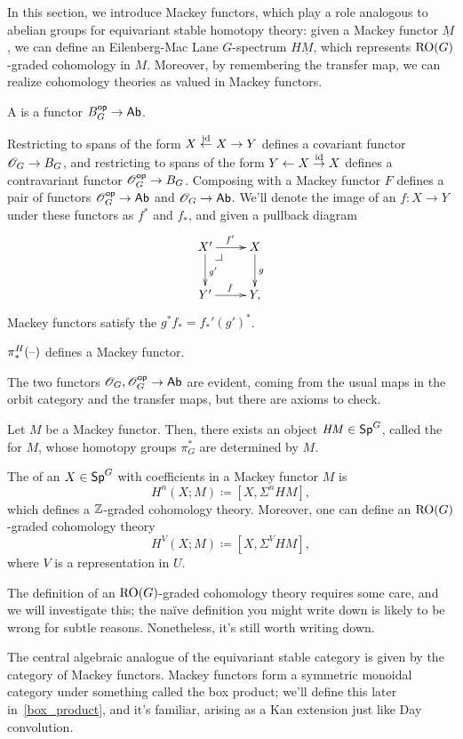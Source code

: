 In this section, we introduce Mackey functors, which play a role analogous to abelian groups for equivariant stable
homotopy theory: given a Mackey functor $\underline M$, we can define an Eilenberg-Mac Lane $G$-spectrum
$H\underline M$, which represents $\mathrm{RO}(G)$-graded cohomology in $M$. Moreover, by remembering the transfer map, we
can realize cohomology theories as valued in Mackey functors.
\begin{defn}
A  is a functor $B_G^{\mathsf{op}}\to\mathsf{Ab}$.
\end{defn}
Restricting to spans of the form $X\stackrel{\mathrm{id}}\gets X\to Y$ defines a covariant functor
$\mathscr O_G\to B_G$, and restricting to spans of the form $Y\gets X\stackrel{\mathrm{id}}\to X$ defines a contravariant functor
$\mathscr O_G^{\mathsf{op}}\to B_G$. Composing with a Mackey functor $F$ defines a pair of functors $\mathscr O_G^{\mathsf{op}}\to\mathsf{Ab}$ and
$\mathscr O_G\to\mathsf{Ab}$. We'll denote the image of an $f\colon X\to Y$ under these functors as $f^*$ and $f_*$, and given a
pullback diagram
\[\xymatrix{
	X'\ar[r]^{f'}\ar[d]^{g'}\pushoutcorner & X\ar[d]^g\\
	Y'\ar[r]^f & Y,
}\]
Mackey functors satisfy the  $g^*f_* = f_*'(g')^*$.
\begin{prop}
$\pi_*^H(\text{--})$ defines a Mackey functor.
\end{prop}
The two functors $\mathscr O_G,\mathscr O_G^{\mathsf{op}}\to\mathsf{Ab}$ are evident, coming from the usual maps in the orbit category and the
transfer maps, but there are axioms to check.

Let $M$ be a Mackey functor. Then, there exists an object $\mathit{HM}\in\mathsf{Sp}^G$, called the  for $M$, whose homotopy groups $\pi_G^*$ are determined by $M$.
\begin{defn}
The  of an $X\in\mathsf{Sp}^G$ with coefficients in a Mackey functor $M$ is
\[H^n(X;M)\coloneqq [X, \Sigma^n \mathit{HM}],\]
which defines a $\mathbb Z$-graded cohomology theory. Moreover, one can define an $\mathrm{RO}(G)$-graded cohomology theory
\[H^V(X;M)\coloneqq [X, \Sigma^V \mathit{HM}],\]
where $V$ is a representation in $U$.
\end{defn}
The definition of an $\mathrm{RO}(G)$-graded cohomology theory requires some care, and we will investigate this; the naïve
definition you might write down is likely to be wrong for subtle reasons. Nonetheless, it's still worth writing
down.

The central algebraic analogue of the equivariant stable category is given by the category of Mackey functors.
Mackey functors form a symmetric monoidal category under something called the box product; we'll define this later
in~\eqref{box_product}, and it's familiar, arising as a Kan extension just like Day convolution.

